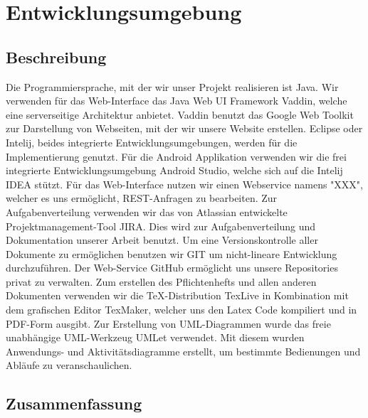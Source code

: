 \chapter{Entwicklungsumgebung}
\section{Beschreibung}
Die Programmiersprache, mit der wir unser Projekt realisieren ist Java. Wir verwenden f\"ur das Web-Interface das Java Web UI Framework Vaddin, welche eine serverseitige Architektur anbietet. Vaddin benutzt das Google Web Toolkit zur Darstellung von Webseiten, mit der wir unsere Website erstellen. \newline 
Eclipse oder Intelij, beides integrierte Entwicklungsumgebungen, werden für die Implementierung genutzt. \newline 
Für die Android Applikation verwenden wir die frei integrierte Entwicklungsumgebung Android Studio, welche sich auf die Intelij IDEA stützt.\newline
F\"ur das Web-Interface nutzen wir einen Webservice namens "XXX", welcher es uns erm\"oglicht, REST-Anfragen zu bearbeiten. \linebreak
Zur Aufgabenverteilung verwenden wir das von Atlassian entwickelte Projektmanagement-Tool JIRA. Dies wird zur Aufgabenverteilung und Dokumentation unserer Arbeit benutzt. 
Um eine Versionskontrolle aller Dokumente zu ermöglichen benutzen wir GIT um nicht-lineare Entwicklung durchzuführen. 
Der Web-Service GitHub ermöglicht uns unsere Repositories privat zu verwalten. \newline
Zum erstellen des Pflichtenhefts und allen anderen Dokumenten verwenden wir die TeX-Distribution TexLive in Kombination mit dem grafischen Editor TexMaker, welcher uns den Latex Code kompiliert und in PDF-Form ausgibt.
\linebreak
Zur Erstellung von UML-Diagrammen wurde das freie unabhängige UML-Werkzeug UMLet verwendet.  Mit diesem wurden Anwendungs- und Aktivitätsdiagramme erstellt, um bestimmte Bedienungen und Abläufe zu veranschaulichen.
\section{Zusammenfassung}